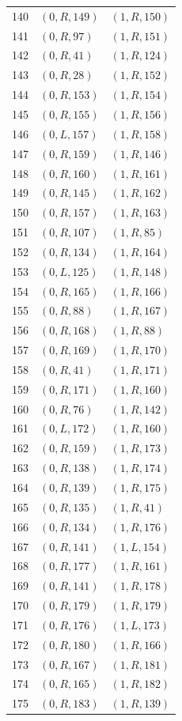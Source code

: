\begin{longtable}{@{}rll@{}}
140 & $(0,R,149)$ & $(1,R,150)$\\
141 & $(0,R,97)$ & $(1,R,151)$\\
142 & $(0,R,41)$ & $(1,R,124)$\\
143 & $(0,R,28)$ & $(1,R,152)$\\
144 & $(0,R,153)$ & $(1,R,154)$\\
145 & $(0,R,155)$ & $(1,R,156)$\\
146 & $(0,L,157)$ & $(1,R,158)$\\
147 & $(0,R,159)$ & $(1,R,146)$\\
148 & $(0,R,160)$ & $(1,R,161)$\\
149 & $(0,R,145)$ & $(1,R,162)$\\
150 & $(0,R,157)$ & $(1,R,163)$\\
151 & $(0,R,107)$ & $(1,R,85)$\\
152 & $(0,R,134)$ & $(1,R,164)$\\
153 & $(0,L,125)$ & $(1,R,148)$\\
154 & $(0,R,165)$ & $(1,R,166)$\\
155 & $(0,R,88)$ & $(1,R,167)$\\
156 & $(0,R,168)$ & $(1,R,88)$\\
157 & $(0,R,169)$ & $(1,R,170)$\\
158 & $(0,R,41)$ & $(1,R,171)$\\
159 & $(0,R,171)$ & $(1,R,160)$\\
160 & $(0,R,76)$ & $(1,R,142)$\\
161 & $(0,L,172)$ & $(1,R,160)$\\
162 & $(0,R,159)$ & $(1,R,173)$\\
163 & $(0,R,138)$ & $(1,R,174)$\\
164 & $(0,R,139)$ & $(1,R,175)$\\
165 & $(0,R,135)$ & $(1,R,41)$\\
166 & $(0,R,134)$ & $(1,R,176)$\\
167 & $(0,R,141)$ & $(1,L,154)$\\
168 & $(0,R,177)$ & $(1,R,161)$\\
169 & $(0,R,141)$ & $(1,R,178)$\\
170 & $(0,R,179)$ & $(1,R,179)$\\
171 & $(0,R,176)$ & $(1,L,173)$\\
172 & $(0,R,180)$ & $(1,R,166)$\\
173 & $(0,R,167)$ & $(1,R,181)$\\
174 & $(0,R,165)$ & $(1,R,182)$\\
175 & $(0,R,183)$ & $(1,R,139)$\\

\end{longtable}
